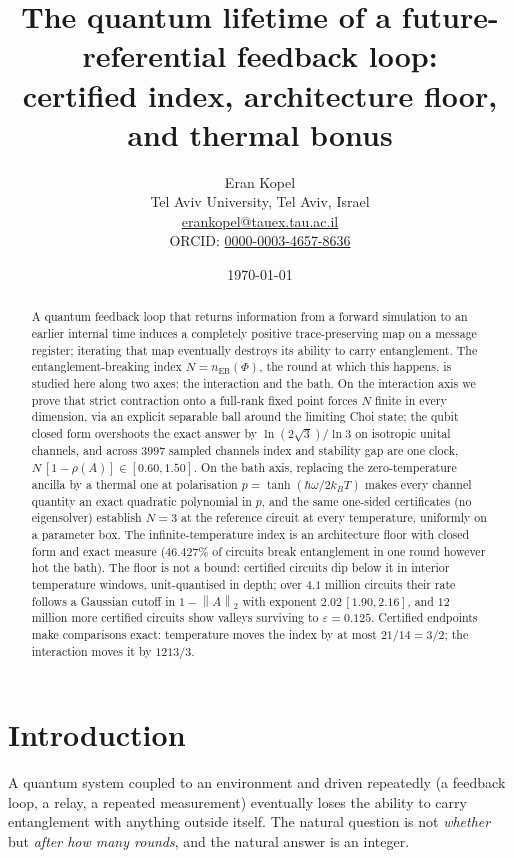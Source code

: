 \documentclass[11pt,a4paper]{article}
\title{The quantum lifetime of a future-referential feedback loop:\\
certified index, architecture floor, and thermal bonus}
\author{Eran Kopel\\[3pt]
  {\normalsize Tel Aviv University, Tel Aviv, Israel}\\[2pt]
  {\normalsize \href{mailto:erankopel@tauex.tau.ac.il}{erankopel@tauex.tau.ac.il}}\\[2pt]
  {\normalsize ORCID: \href{https://orcid.org/0000-0003-4657-8636}{0000-0003-4657-8636}}}
\date{\today}
\theoremstyle{definition}
\theoremstyle{remark}
\newcommand{\nEB}{n_{\mathrm{EB}}}
\newcommand{\opn}[1]{\left\lVert #1 \right\rVert_{2}}
\begin{document}
\maketitle


\begin{abstract}
A quantum feedback loop that returns information from a forward simulation to
an earlier internal time induces a completely positive trace-preserving map on
a message register; iterating that map eventually destroys its ability to
carry entanglement. The entanglement-breaking index $N=\nEB(\Phi)$, the round
at which this happens, is studied here along two axes: the interaction and the
bath. On the interaction axis we prove that strict contraction onto a
full-rank fixed point forces $N$ finite in every dimension, via an explicit
separable ball around the limiting Choi state; the qubit closed form
overshoots the exact answer by $\ln(2\sqrt3)/\ln3$ on isotropic unital
channels, and across $3997$ sampled channels index and stability gap are one
clock, $N\,[1-\rho(A)]\in[0.60,1.50]$. On the bath axis, replacing the
zero-temperature ancilla by a thermal one at polarisation
$p=\tanh(\hbar\omega/2k_BT)$ makes every channel quantity an exact quadratic
polynomial in $p$, and the same one-sided certificates (no eigensolver)
establish $N=3$ at the reference circuit at every temperature, uniformly on a
parameter box. The infinite-temperature index is an architecture floor with
closed form and exact measure ($46.427\%$ of circuits break entanglement in
one round however hot the bath). The floor is not a bound: certified circuits
dip below it in interior temperature windows, unit-quantised in depth; over
$4.1$ million circuits their rate follows a Gaussian cutoff in $1-\opn{A}$
with exponent $2.02\,[1.90,2.16]$, and $12$ million more certified circuits
show valleys surviving to $\varepsilon=0.125$. Certified endpoints make
comparisons exact: temperature moves the index by at most $21/14=3/2$; the
interaction moves it by $1213/3$.
\end{abstract}


\section{Introduction}\label{sec:intro}

A quantum system coupled to an environment and driven repeatedly (a feedback
loop, a relay, a repeated measurement) eventually loses the ability to carry
entanglement with anything outside itself. The natural question is not
\emph{whether} but \emph{after how many rounds}, and the natural answer is an
integer.
\end{document}
